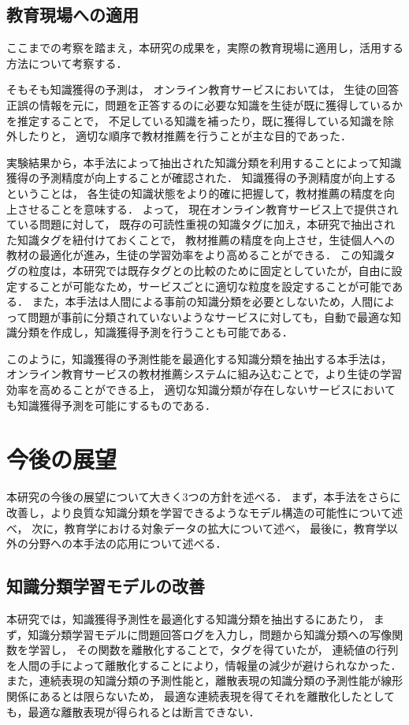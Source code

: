 \subsection{教育現場への適用}
ここまでの考察を踏まえ，本研究の成果を，実際の教育現場に適用し，活用する方法について考察する．

そもそも知識獲得の予測は，
オンライン教育サービスにおいては，
生徒の回答正誤の情報を元に，問題を正答するのに必要な知識を生徒が既に獲得しているかを推定することで，
不足している知識を補ったり，既に獲得している知識を除外したりと，
適切な順序で教材推薦を行うことが主な目的であった．

実験結果から，本手法によって抽出された知識分類を利用することによって知識獲得の予測精度が向上することが確認された．
知識獲得の予測精度が向上するということは，
各生徒の知識状態をより的確に把握して，教材推薦の精度を向上させることを意味する．
よって，
現在オンライン教育サービス上で提供されている問題に対して，
既存の可読性重視の知識タグに加え，本研究で抽出された知識タグを紐付けておくことで，
教材推薦の精度を向上させ，生徒個人への教材の最適化が進み，生徒の学習効率をより高めることができる．
この知識タグの粒度は，本研究では既存タグとの比較のために固定としていたが，自由に設定することが可能なため，サービスごとに適切な粒度を設定することが可能である．
また，本手法は人間による事前の知識分類を必要としないため，人間によって問題が事前に分類されていないようなサービスに対しても，自動で最適な知識分類を作成し，知識獲得予測を行うことも可能である．

このように，知識獲得の予測性能を最適化する知識分類を抽出する本手法は，
オンライン教育サービスの教材推薦システムに組み込むことで，より生徒の学習効率を高めることができる上，
適切な知識分類が存在しないサービスにおいても知識獲得予測を可能にするものである．


\section{今後の展望}
本研究の今後の展望について大きく3つの方針を述べる．
まず，本手法をさらに改善し，より良質な知識分類を学習できるようなモデル構造の可能性について述べ，
次に，教育学における対象データの拡大について述べ，
最後に，教育学以外の分野への本手法の応用について述べる．


\subsection{知識分類学習モデルの改善}
本研究では，知識獲得予測性を最適化する知識分類を抽出するにあたり，
まず，知識分類学習モデルに問題回答ログを入力し，問題から知識分類への写像関数を学習し，
その関数を離散化することで，タグを得ていたが，
連続値の行列を人間の手によって離散化することにより，情報量の減少が避けられなかった．
また，連続表現の知識分類の予測性能と，離散表現の知識分類の予測性能が線形関係にあるとは限らないため，
最適な連続表現を得てそれを離散化したとしても，最適な離散表現が得られるとは断言できない．

